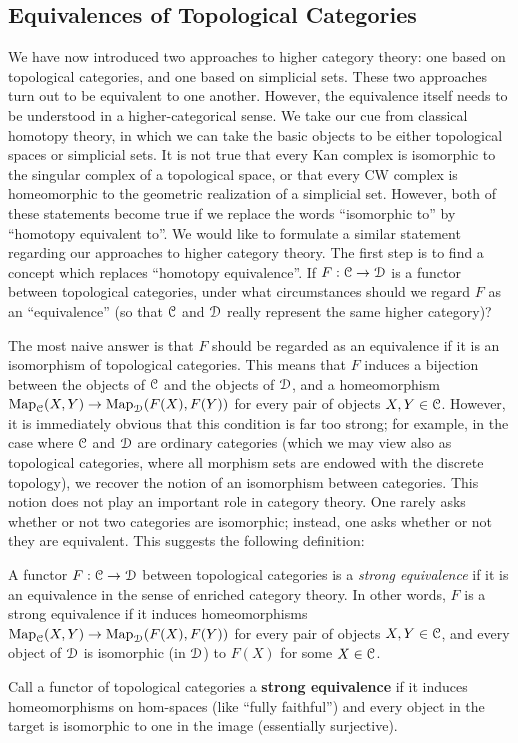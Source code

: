 \subsection{Equivalences of Topological Categories}\label{stronghcat}
\begin{1.1.3 Equivalences of Top Cats}
We have now introduced two approaches to higher category theory: one based on topological categories, and one based on simplicial sets. These two approaches turn out to be equivalent to one another. However, the equivalence itself needs to be understood in a higher-categorical sense. We take our cue from classical homotopy theory, in which we can take the basic objects to be either topological spaces or simplicial sets. It is not true that every Kan complex is isomorphic to the singular complex of a topological space, or that every CW complex is homeomorphic to the geometric realization of a simplicial set. However, both of these statements become true if we replace the words ``isomorphic to'' by ``homotopy equivalent to''. We would like to formulate a similar statement regarding our approaches to higher category theory. The first step is to find a concept which replaces ``homotopy equivalence''. If $F: \operatorname{\mathcal{C}} \rightarrow \operatorname{\mathcal{D}}$ is a functor between topological categories, under what circumstances should we regard $F$ as an ``equivalence'' (so that $\operatorname{\mathcal{C}}$ and $\operatorname{\mathcal{D}}$ really represent the same higher category)? 

The most naive answer is that $F$ should be regarded as an equivalence if it is an isomorphism of topological categories. This means that $F$ induces a bijection between the objects of $\operatorname{\mathcal{C}}$ and the objects of $\operatorname{\mathcal{D}}$, and a homeomorphism $\operatorname{{Map}}_{\operatorname{\mathcal{C}}}(X,Y) \rightarrow \operatorname{{Map}}_{\operatorname{\mathcal{D}}}(F(X),F(Y))$ for every pair of objects $X,Y \in \operatorname{\mathcal{C}}$. However, it is immediately obvious that this condition is far too strong; for example, in the case where $\operatorname{\mathcal{C}}$ and $\operatorname{\mathcal{D}}$ are ordinary categories (which we may view also as topological categories, where all morphism sets are endowed with the discrete topology), we recover the notion of an isomorphism between categories. This notion does not play an important role in category theory. One rarely asks whether or not two categories are isomorphic; instead, one asks whether or not they are equivalent. This suggests the following definition:

\begin{definition}
A functor $F: \operatorname{\mathcal{C}} \rightarrow \operatorname{\mathcal{D}}$ between topological categories is a  {\it strong equivalence} if it is an equivalence in the sense of enriched category theory. In other words, $F$ is a strong equivalence if it induces homeomorphisms $\operatorname{{Map}}_{\operatorname{\mathcal{C}}}(X,Y) \rightarrow \operatorname{{Map}}_{\operatorname{\mathcal{D}}}(F(X),F(Y))$ for every pair of objects $X,Y \in \operatorname{\mathcal{C}}$, and every object of $\operatorname{\mathcal{D}}$ is isomorphic (in $\operatorname{\mathcal{D}}$) to $F(X)$ for some $X \in \operatorname{\mathcal{C}}$.
\end{definition}
\begin{shaded}
Call a functor of topological categories a \textbf{strong equivalence} if it induces homeomorphisms on hom-spaces (like ``fully faithful'') and every object in the target is isomorphic to one in the image (essentially surjective).


\end{shaded}
\end{1.1.3 Equivalences of Top Cats}
